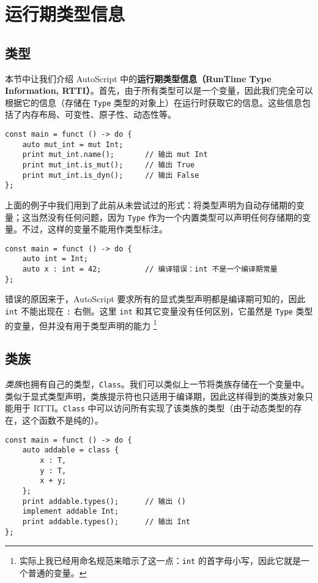 \section{运行期类型信息}

\subsection{类型}

本节中让我们介绍 AutoScript 中的\textbf{运行期类型信息（RunTime Type Information, RTTI）}。首先，由于所有类型可以是一个变量，因此我们完全可以根据它的信息（存储在 \lstinline!Type! 类型的对象上）在运行时获取它的信息。这些信息包括了内存布局、可变性、原子性、动态性等。

\begin{lstlisting}
const main = funct () -> do {
	auto mut_int = mut Int;
	print mut_int.name();		// 输出 mut Int
	print mut_int.is_mut();		// 输出 True
	print mut_int.is_dyn();		// 输出 False
};
\end{lstlisting}

上面的例子中我们用到了此前从未尝试过的形式：将类型声明为自动存储期的变量；这当然没有任何问题，因为 \lstinline!Type! 作为一个内置类型可以声明任何存储期的变量。不过，这样的变量不能用作类型标注。

\begin{lstlisting}
const main = funct () -> do {
	auto int = Int;
	auto x : int = 42;			// 编译错误：int 不是一个编译期常量
};
\end{lstlisting}

错误的原因来于，AutoScript 要求所有的显式类型声明都是编译期可知的，因此 \lstinline!int! 不能出现在 \lstinline!:! 右侧。这里 \lstinline!int! 和其它变量没有任何区别，它虽然是 \lstinline!Type! 类型的变量，但并没有用于类型声明的能力 \footnote{实际上我已经用命名规范来暗示了这一点：\lstinline!int! 的首字母小写，因此它就是一个普通的变量。}

\subsection{类族}

\emph{类族}也拥有自己的类型，\lstinline!Class!。我们可以类似上一节将类族存储在一个变量中。类似于显式类型声明，类族提示符也只适用于编译期，因此这样得到的类族对象只能用于 RTTI。\lstinline!Class! 中可以访问所有实现了该类族的类型（由于动态类型的存在，这个函数不是纯的）。

\begin{lstlisting}
const main = funct () -> do {
	auto addable = class {
		x : T,
		y : T,
		x + y;
	};
	print addable.types();		// 输出 ()
	implement addable Int;
	print addable.types();		// 输出 Int
};
\end{lstlisting}

